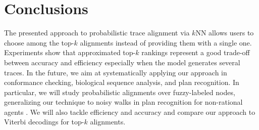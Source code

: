
\section{Conclusions}
\label{sec:conclusion}

The presented approach to probabilistic trace alignment via $k$NN allows users to choose among the top-$k$ alignments instead of providing them with a single one. Experiments show that approximated top-$k$ rankings represent a good trade-off between accuracy and efficiency especially when the model generates several traces. In the future, we aim at systematically applying our approach in conformance checking, biological sequence analysis, and plan recognition. In particular, we will study probabilistic alignments over fuzzy-labeled nodes, generalizing our technique to noisy walks in plan recognition for non-rational agents \cite{RamirezG10}. We will also tackle efficiency and accuracy and compare our approach to Viterbi decodings for top-$k$ alignments.
